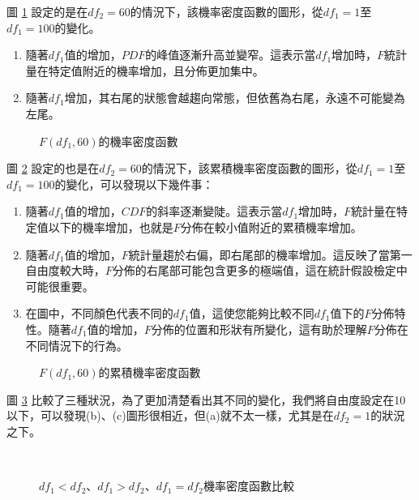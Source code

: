 \documentclass[12pt, a4paper]{article}
\begin{document}
圖 \ref{fig:F-distribution_pdf_fixeddf2} 設定的是在$df_2=60$的情況下，該機率密度函數的圖形，從$df_1=1$至$df_1=100$的變化。
\begin{enumerate}
\item 隨著$df_1$值的增加，$PDF$的峰值逐漸升高並變窄。這表示當$df_1$增加時，$F$統計量在特定值附近的機率增加，且分佈更加集中。
\item 隨著$df_1$增加，其右尾的狀態會越趨向常態，但依舊為右尾，永遠不可能變為左尾。
\end{enumerate}
\begin{figure}[h]
    \caption{$F(df_1,60)$的機率密度函數}
    \label{fig:F-distribution_pdf_fixeddf2}
\end{figure}
圖 \ref{fig:F-distribution_cdf} 設定的也是在$df_2=60$的情況下，該累積機率密度函數的圖形，從$df_1=1$至$df_1=100$的變化，可以發現以下幾件事：
\begin{enumerate}
\item 隨著$df_1$值的增加，$CDF$的斜率逐漸變陡。這表示當$df_1$增加時，$F$統計量在特定值以下的機率增加，也就是$F$分佈在較小值附近的累積機率增加。
\item 隨著$df_1$值的增加，$F$統計量趨於右偏，即右尾部的機率增加。這反映了當第一自由度較大時，$F$分佈的右尾部可能包含更多的極端值，這在統計假設檢定中可能很重要。
\item 在圖中，不同顏色代表不同的$df_1$值，這使您能夠比較不同$df_1$值下的$F$分佈特性。隨著$df_1$值的增加，$F$分佈的位置和形狀有所變化，這有助於理解$F$分佈在不同情況下的行為。
\end{enumerate}
\begin{figure}[h]
    \caption{$F(df_1,60)$的累積機率密度函數}
    \label{fig:F-distribution_cdf}
\end{figure}

圖 \ref{fig:F-distribution_pdf_df_1<df_2、df_1>df_2、df_1=df_2} 比較了三種狀況，為了更加清楚看出其不同的變化，我們將自由度設定在10以下，可以發現(b)、(c)圖形很相近，但(a)就不太一樣，尤其是在$df_2=1$的狀況之下。

\begin{figure}[H]
    \centering
        \\
        \subfloat[$F(df_1,df_2),df_1=df_2$]{
        \texttt{[image: \\imgdir F-distribution\_pdf\_df1=df2.png]}}
    \caption{$df_1<df_2$、$df_1>df_2$、$df_1=df_2$機率密度函數比較}
    \label{fig:F-distribution_pdf_df_1<df_2、df_1>df_2、df_1=df_2}
\end{figure}
\end{document}
